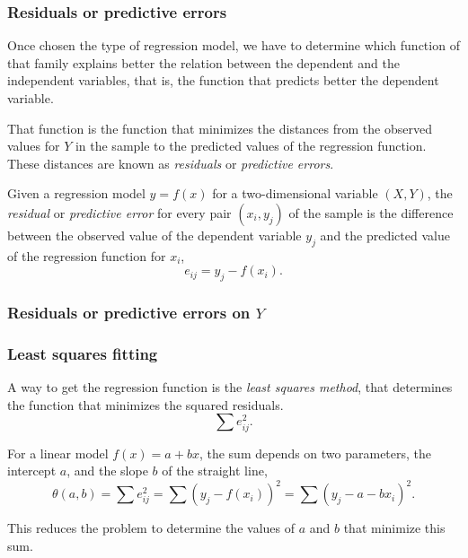 \begin{frame}
\frametitle{Residuals or predictive errors}
Once chosen the type of regression model, we have to determine which function of that family explains better the relation between the dependent and the independent variables, that is, the function that predicts better the dependent variable. 

That function is the function that minimizes the distances from the observed values for $Y$ in the sample to the predicted values of the regression function.
These distances are known as \emph{residuals} or \emph{predictive errors}.

\begin{definition}
Given a regression model $y=f(x)$ for a two-dimensional variable $(X,Y)$, the \emph{residual} or \emph{predictive error} for every pair $(x_i,y_j)$ of the sample is the difference between the observed value of the dependent variable $y_j$ and the predicted value of the regression function for $x_i$,
\[
e_{ij} = y_j-f(x_i).
\]
\end{definition}
\end{frame}


\begin{frame}
\frametitle{Residuals or predictive errors on $Y$}
\centering
{}
\end{frame}


\begin{frame}
\frametitle{Least squares fitting}
A way to get the regression function is the \emph{least squares method}, that determines the function that minimizes the squared residuals.
\[
\sum e_{ij}^2.
\]

For a linear model $f(x) = a + bx$, the sum depends on two parameters, the intercept $a$, and the slope $b$ of the straight line,
\[
\theta(a,b) = \sum e_{ij}^2 =\sum (y_j - f(x_i))^2 =\sum (y_j-a-bx_i)^2.
\]

This reduces the problem to determine the values of $a$ and $b$ that minimize this sum. 
\end{frame}


